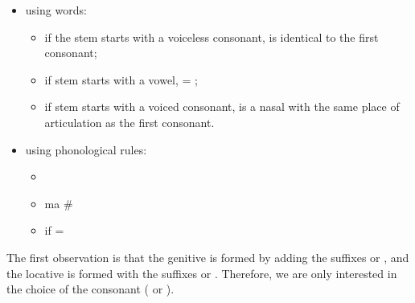 \begin{refsection}
\begin{mysolution}
\begin{solutions}
\begin{itemize}
\item using words: 
  \begin{itemize}
  \item if the stem starts with a voiceless consonant,  is identical to the first consonant;
  \item if stem starts with a vowel,  = ;
  \item if stem starts with a voiced consonant,  is a nasal with the same place of articulation as the first consonant.
  \end{itemize}
\item using phonological rules:
  \begin{itemize}
  \item
  \item

             {ma}
             {\#{\longrule}}



  \item {} if  = 

  \end{itemize}
\end{itemize}

\item The first observation is that the genitive is formed by adding the suffixes  or , and the locative is formed with the suffixes  or . Therefore, we are only interested in the choice of the consonant ( or ).


\end{solutions}
\end{mysolution}
\end{refsection}
